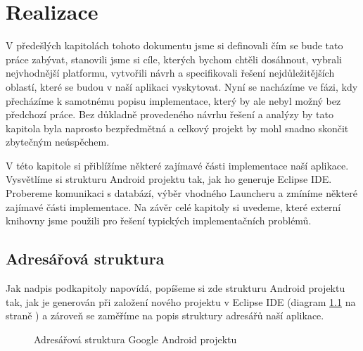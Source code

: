 \documentclass[thesis=M,czech]{FITthesis}[2012/06/26]
\begin{document}
\chapter{Realizace}
V předešlých kapitolách tohoto dokumentu jsme si definovali čím se bude tato práce zabývat, stanovili jsme si cíle, kterých bychom chtěli dosáhnout, vybrali nejvhodnější platformu, vytvořili návrh a specifikovali řešení nejdůležitějších oblastí, které se budou v naší aplikaci vyskytovat. Nyní se nacházíme ve fázi, kdy přecházíme k samotnému popisu implementace, který by ale nebyl možný bez předchozí práce. Bez důkladně provedeného návrhu řešení a analýzy by tato kapitola byla naprosto bezpředmětná a celkový projekt by mohl snadno skončit zbytečným neúspěchem. 

V této kapitole si přiblížíme některé zajímavé části implementace naší aplikace. Vysvětlíme si strukturu Android projektu tak, jak ho generuje Eclipse IDE. Probereme komunikaci s databází, výběr vhodného Launcheru a zmíníme některé zajímavé části implementace. Na závěr celé kapitoly si uvedeme, které externí knihovny jsme použili pro řešení typických implementačních problémů.

\section{Adresářová struktura}
Jak nadpis podkapitoly napovídá, popíšeme si zde strukturu Android projektu \cite{android_project_structure} tak, jak je generován při založení nového projektu v Eclipse IDE (diagram \ref{fig:android_project_structure} na straně \pageref{fig:android_project_structure}) a zároveň se zaměříme na popis struktury adresářů naší aplikace.

\begin{figure}
\caption{Adresářová struktura Google Android projektu}
\label{fig:android_project_structure}
\end{figure}
\end{document}
